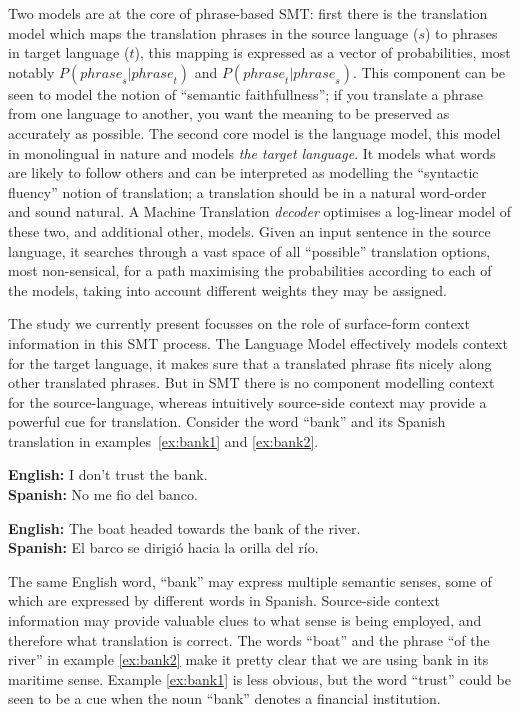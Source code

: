 \documentclass[11pt]{article}
\theoremstyle{break}
\begin{document}
Two models are at the core of phrase-based SMT: first there is the translation
model which maps the translation phrases in the source language ($s$) to
phrases in target language ($t$), this mapping is expressed as a vector of
probabilities, most notably $P({phrase}_s|{phrase}_t)$ and
$P({phrase}_t|{phrase}_s)$. This component can be seen to model the notion of
``semantic faithfullness''; if you translate a phrase from one language to
another, you want the meaning to be preserved as accurately as possible. The
second core model is the language model, this model in monolingual in nature
and models \emph{the target language}. It models what words are likely to
follow others and can be interpreted as modelling the ``syntactic fluency''
notion of translation; a translation should be in a natural word-order and
sound natural. A Machine Translation \emph{decoder} optimises a log-linear
model of these two, and additional other, models. Given an input sentence in
the source language, it searches through a vast space of all ``possible''
translation options, most non-sensical, for a path maximising the probabilities
according to each of the models, taking into account different weights they may
be assigned.

The study we currently present focusses on the role of surface-form context
information in this SMT process. The Language Model effectively models context
for the target language, it makes sure that a translated phrase fits nicely
along other translated phrases. But in SMT there is no component modelling
context for the source-language, whereas intuitively source-side context may
provide a powerful cue for translation. Consider the word ``bank'' and its
Spanish translation in examples~\ref{ex:bank1} and \ref{ex:bank2}.

\begin{exe} %
\ex \textbf{English:} I don't trust the bank. \\
    \textbf{Spanish:} No me fio del banco.
\label{ex:bank1}

\ex \textbf{English:} The boat headed towards the bank of the river. \\
    \textbf{Spanish:} El barco se dirigió hacia la orilla del río.
\label{ex:bank2}
\end{exe}

The same English word, ``bank'' may express multiple semantic senses, some of
which are expressed by different words in Spanish. Source-side context
information may provide valuable clues to what sense is being employed, and
therefore what translation is correct.  The words ``boat'' and the phrase ``of
the river'' in example \ref{ex:bank2} make it pretty clear that we are using
bank in its maritime sense. Example \ref{ex:bank1} is less obvious, but the
word ``trust'' could be seen to be a cue when the noun ``bank'' denotes a
financial institution.
\end{document}
